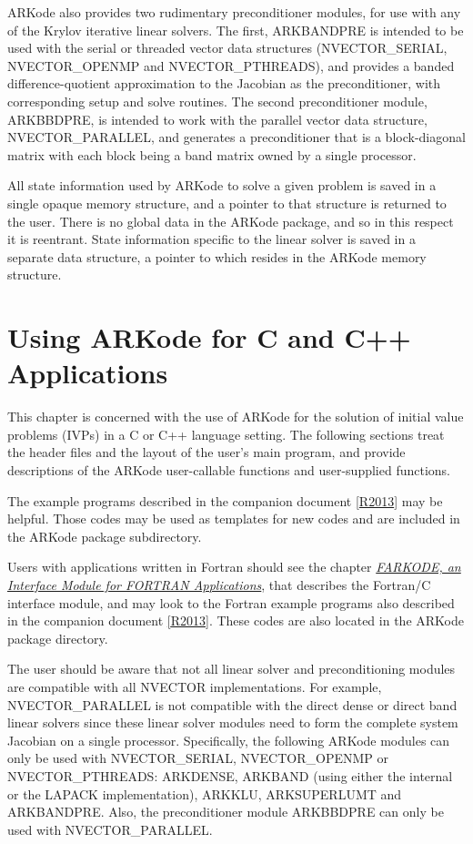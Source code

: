 \documentclass[letterpaper,10pt,english]{sphinxmanual}
\begin{document}
ARKode also provides two rudimentary preconditioner modules, for
use with any of the Krylov iterative linear solvers.  The first,
ARKBANDPRE is intended to be used with the serial or threaded vector
data structures (NVECTOR\_SERIAL, NVECTOR\_OPENMP and NVECTOR\_PTHREADS),
and provides a banded difference-quotient approximation to the
Jacobian as the preconditioner, with corresponding setup and solve
routines.  The second preconditioner module, ARKBBDPRE, is intended to
work with the parallel vector data structure, NVECTOR\_PARALLEL, and
generates a preconditioner that is a block-diagonal matrix with each
block being a band matrix owned by a single processor.

All state information used by ARKode to solve a given problem is
saved in a single opaque memory structure, and a pointer to that
structure is returned to the user.  There is no global data in the
ARKode package, and so in this respect it is reentrant.  State
information specific to the linear solver is saved in a separate data
structure, a pointer to which resides in the ARKode memory
structure.


\chapter{Using ARKode for C and C++ Applications}
\label{c_interface/index::doc}\label{c_interface/index:using-arkode-for-c-and-c-applications}\label{c_interface/index:cinterface}
This chapter is concerned with the use of ARKode for the solution
of initial value problems (IVPs) in a C or C++ language setting.  The
following sections treat the header files and the layout of the user's
main program, and provide descriptions of the ARKode user-callable
functions and user-supplied functions.

The example programs described in the companion document {\hyperref[References:r2013]{{[}R2013{]}}} may
be helpful. Those codes may be used as templates for new codes and are
included in the ARKode package  subdirectory.

Users with applications written in Fortran should see the chapter
{\hyperref[f_interface/index:fortraninterface]{\emph{FARKODE, an Interface Module for FORTRAN Applications}}}, that describes the Fortran/C interface
module, and may look to the Fortran example programs also described in
the companion document {\hyperref[References:r2013]{{[}R2013{]}}}.  These codes are also located in the
ARKode package  directory.

The user should be aware that not all linear solver and
preconditioning modules are compatible with all NVECTOR
implementations.  For example, NVECTOR\_PARALLEL is not compatible with
the direct dense or direct band linear solvers since these linear
solver modules need to form the complete system Jacobian on a single
processor.  Specifically, the following ARKode modules can only be
used with NVECTOR\_SERIAL, NVECTOR\_OPENMP or NVECTOR\_PTHREADS: ARKDENSE,
ARKBAND (using either the internal or the LAPACK implementation),
ARKKLU, ARKSUPERLUMT and ARKBANDPRE. Also, the preconditioner
module ARKBBDPRE can only be used with NVECTOR\_PARALLEL.
\end{document}
